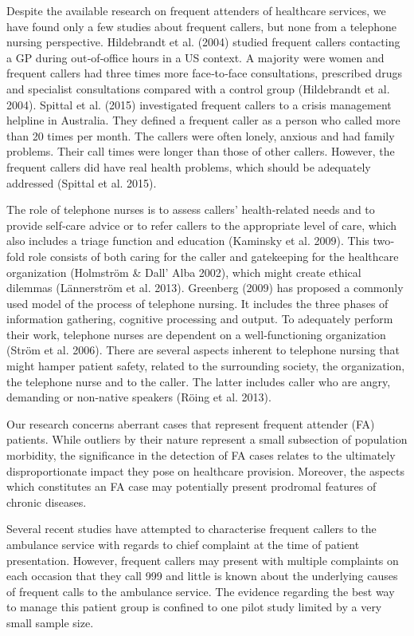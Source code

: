 Despite the available research on frequent attenders of healthcare services, we have found only a few studies about frequent callers, but none from a telephone nursing perspective. Hildebrandt et al. (2004) studied frequent callers contacting a GP during out‐of‐office hours in a US context. A majority were women and frequent callers had three times more face‐to‐face consultations, prescribed drugs and specialist consultations compared with a control group (Hildebrandt et al. 2004). Spittal et al. (2015) investigated frequent callers to a crisis management helpline in Australia. They defined a frequent caller as a person who called more than 20 times per month. The callers were often lonely, anxious and had family problems. Their call times were longer than those of other callers. However, the frequent callers did have real health problems, which should be adequately addressed (Spittal et al. 2015). \cite{holmstrom2017frequent}

The role of telephone nurses is to assess callers’ health‐related needs and to provide self‐care advice or to refer callers to the appropriate level of care, which also includes a triage function and education (Kaminsky et al. 2009). This two‐fold role consists of both caring for the caller and gatekeeping for the healthcare organization (Holmström \& Dall’ Alba 2002), which might create ethical dilemmas (Lännerström et al. 2013). Greenberg (2009) has proposed a commonly used model of the process of telephone nursing. It includes the three phases of information gathering, cognitive processing and output. To adequately perform their work, telephone nurses are dependent on a well‐functioning organization (Ström et al. 2006). There are several aspects inherent to telephone nursing that might hamper patient safety, related to the surrounding society, the organization, the telephone nurse and to the caller. The latter includes caller who are angry, demanding or non‐native speakers (Röing et al. 2013). \cite{holmstrom2017frequent}

Our research concerns aberrant cases that represent frequent attender (FA) patients. While outliers by their nature represent a small subsection of population morbidity, the significance in the detection of FA cases relates to the ultimately disproportionate impact they pose on healthcare provision. Moreover, the aspects which constitutes an FA case may potentially present prodromal features of chronic diseases.   \cite{holmstrom2017frequent}  

Several recent studies have attempted to characterise frequent callers to the ambulance service with regards to chief complaint at the time of patient presentation. However, frequent callers may present with multiple complaints on each occasion that they call 999 and little is known about the underlying causes of frequent calls to the ambulance service. The evidence regarding the best way to manage this patient group is confined to one pilot study limited by a very small sample size.\cite{edwards2015frequent}


